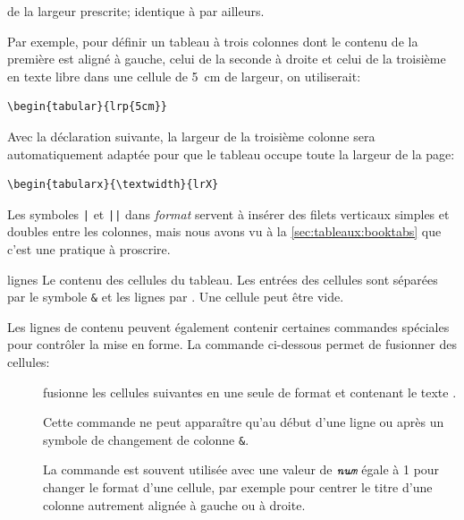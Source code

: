 \begin{list}{}
\begin{description}
    de la largeur prescrite; identique à  par ailleurs.
  \end{description}
  Par exemple, pour définir un tableau à trois colonnes dont le
  contenu de la première est aligné à gauche, celui de la seconde à
  droite et celui de la troisième en texte libre dans une cellule de
  5~cm de largeur, on utiliserait:
\begin{lstlisting}
\begin{tabular}{lrp{5cm}}
\end{lstlisting}
  Avec la déclaration suivante, la largeur de la troisième colonne
  sera automatiquement adaptée pour que le tableau occupe toute la
  largeur de la page:
\begin{lstlisting}
\begin{tabularx}{\textwidth}{lrX}
\end{lstlisting}

  Les symboles \verb=|= et \verb=||= dans \textit{format} servent à
  insérer des filets verticaux simples et doubles entre les colonnes,
  mais nous avons vu à la \autoref{sec:tableaux:booktabs} que c'est
  une pratique à proscrire.
\item[lignes] Le contenu des cellules du tableau. Les entrées des
  cellules sont séparées par le symbole \verb=&= et les lignes par
  {\bs\bs}. Une cellule peut être vide.

  Les lignes de contenu peuvent également contenir certaines commandes
  spéciales pour contrôler la mise en forme. La commande ci-dessous
  permet de fusionner des cellules:
  \begin{description}
  \item[\normalfont{}]
    fusionne les  cellules suivantes en une seule de format
     et contenant le texte . \par%
    Cette commande ne peut apparaître qu'au début d'une ligne ou après
    un symbole de changement de colonne \verb=&=. \par%
    La commande est souvent utilisée avec une valeur de
    $\text{\meta{num}}$ égale à 1 pour changer le format d'une
    cellule, par exemple pour centrer le titre d'une colonne autrement
    alignée à gauche ou à droite.
  \end{description}


\end{list}
